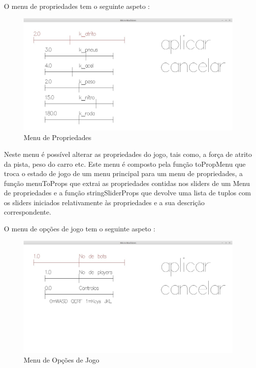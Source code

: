 \documentclass[a4paper]{report} %
\begin{document}
O menu de propriedades tem o seguinte aspeto :

\begin{figure}[!h]
\centering
\includegraphics[scale=0.2]{foto(2).jpg}
\caption{Menu de Propriedades}
\end{figure}


Neste menu é possível alterar as propriedades do jogo, tais como, a força de atrito da pista, peso do carro etc.
Este menu é composto pela função toPropMenu que troca o estado de jogo de um menu principal para um menu de propriedades, a função menuToProps que extrai as propriedades contidas nos sliders de um Menu de propriedades e a função stringSliderProps que devolve uma lista de tuplos com os sliders iniciados relativamente às propriedades e a sua descrição correspondente.



O menu de opções de jogo tem o seguinte aspeto :

\begin{figure}[!h]
\centering
\includegraphics[scale=0.2]{foto(3).jpg}
\caption{Menu de Opções de Jogo}
\end{figure}
\end{document}
